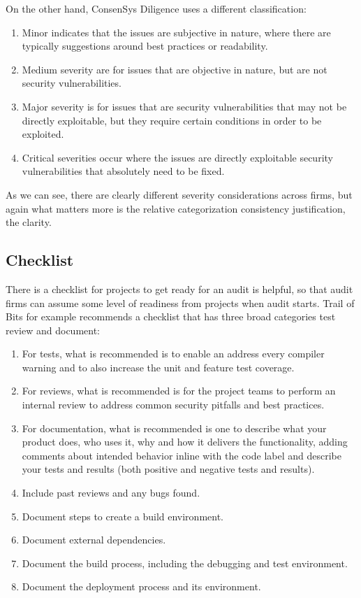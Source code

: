 On the other hand, ConsenSys Diligence uses a different classification:

\begin{enumerate}
\def\labelenumi{\arabic{enumi}.}
\tightlist
\item
  Minor indicates that the issues are subjective in nature, where there
  are typically suggestions around best practices or readability.
\item
  Medium severity are for issues that are objective in nature, but are
  not security vulnerabilities.
\item
  Major severity is for issues that are security vulnerabilities that
  may not be directly exploitable, but they require certain conditions
  in order to be exploited.
\item
  Critical severities occur where the issues are directly exploitable
  security vulnerabilities that absolutely need to be fixed.
\end{enumerate}

As we can see, there are clearly different severity considerations
across firms, but again what matters more is the relative categorization
consistency justification, the clarity.

\subsection{Checklist}\label{checklist}

There is a checklist for projects to get ready for an audit is helpful,
so that audit firms can assume some level of readiness from projects
when audit starts. Trail of Bits for example recommends a checklist that
has three broad categories test review and document:

\begin{enumerate}
\def\labelenumi{\arabic{enumi}.}
\tightlist
\item
  For tests, what is recommended is to enable an address every compiler
  warning and to also increase the unit and feature test coverage.
\item
  For reviews, what is recommended is for the project teams to perform
  an internal review to address common security pitfalls and best
  practices.
\item
  For documentation, what is recommended is one to describe what your
  product does, who uses it, why and how it delivers the functionality,
  adding comments about intended behavior inline with the code label and
  describe your tests and results (both positive and negative tests and
  results).
\item
  Include past reviews and any bugs found.
\item
  Document steps to create a build environment.
\item
  Document external dependencies.
\item
  Document the build process, including the debugging and test
  environment.
\item
  Document the deployment process and its environment.
\end{enumerate}

